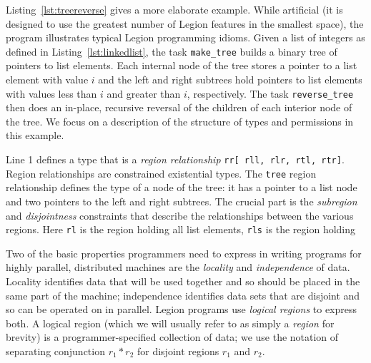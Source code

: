 Listing~\ref{lst:treereverse} gives a more elaborate example.  While
artificial (it is designed to use the greatest number of Legion
features in the smallest space), the program illustrates typical
Legion programming idioms.  Given a list of integers as defined in Listing~\ref{lst:linkedlist}, 
the task {\tt make\_tree} builds a binary tree of pointers to list elements.
Each internal node of the tree stores a pointer to a list element with value $i$
and the left and right subtrees hold pointers to list elements with values less than $i$ and greater than $i$,
respectively.  The task {\tt reverse\_tree} then does an in-place, recursive reversal of the children of each interior
node of the tree.  We focus on a description of the structure of types and permissions in this example.

Line 1 defines a type that is a {\em region relationship} {\tt rr[ rll, rlr, rtl, rtr]}.  Region relationships are
constrained existential types.  The {\tt tree} region relationship defines the type of a node of the tree: it has a pointer
to a list node and two pointers to the left and right subtrees. The crucial part is the {\em subregion} and {\em disjointness}
constraints that describe the relationships between the various regions.  Here {\tt rl} is the region holding all list elements,
{\tt rls} is the region holding



Two of the basic properties programmers need to express in writing
programs for highly parallel, distributed machines are the {\em
locality} and {\em independence} of data. Locality identifies data
that will be used together and so should be placed in the same part of
the machine; independence identifies data sets that are disjoint and
so can be operated on in parallel.  Legion programs use {\em logical
regions} to express both.  A logical region (which we will usually
refer to as simply a {\em region} for brevity) is a
programmer-specified collection of data; we use the notation of
separating conjunction $r_1 \ast r_2$ for disjoint regions $r_1$ and
$r_2$.







